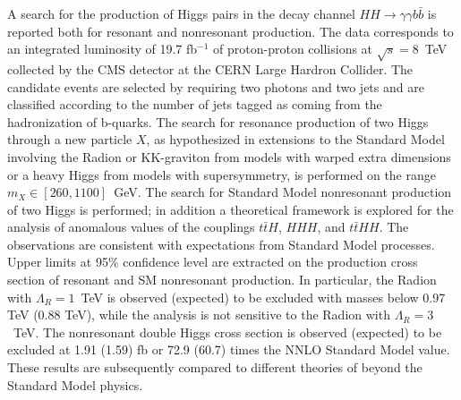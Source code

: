 A search for the production of Higgs pairs in the decay channel
$HH \rightarrow \gamma\gamma b\bar{b}$ is reported both for
resonant and nonresonant production. The data corresponds to an integrated
luminosity of 19.7 fb$^{-1}$ of proton-proton collisions at $\sqrt{s}=8$~TeV collected by the
CMS detector at the CERN Large Hardron Collider.
The candidate events are selected by requiring two photons and two jets and are classified
according to the number of jets tagged as coming from the hadronization of b-quarks.
The search for resonance production of two Higgs
through a new particle $X$, as hypothesized in extensions
to the Standard Model involving the Radion or KK-graviton from models with warped extra dimensions
or a heavy Higgs from models with supersymmetry,
is performed on the range $m_X \in [260, 1100]$~GeV.
The search for Standard Model nonresonant production of two Higgs is performed; in addition
a theoretical framework is explored for the analysis of anomalous values of the couplings
$t\bar{t}H$, $HHH$, and $t\bar{t}HH$.
The observations are consistent with expectations from Standard Model processes.
Upper limits at 95\% confidence level are extracted on the production cross section
of resonant and SM nonresonant production.
In particular, the Radion with $\Lambda_R = 1$~TeV is observed (expected) to be excluded with masses
below 0.97 TeV (0.88 TeV), while the analysis is not sensitive to the Radion with $\Lambda_R = 3$~TeV.
The nonresonant double Higgs cross section is observed (expected) to be excluded at
1.91 (1.59) fb or 72.9 (60.7) times the NNLO Standard Model value.
These results are subsequently compared to different theories of beyond the Standard Model physics.
